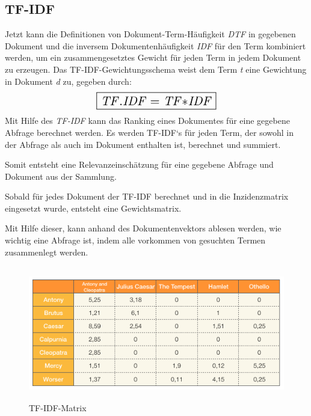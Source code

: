 \subsection[TF{}-IDF]{TF-IDF}
Jetzt kann die Definitionen von Dokument-Term-Häufigkeit \textit{DTF} in
gegebenen Dokument und die inversem Dokumentenhäufigkeit \textit{IDF} für den
Term kombiniert werden, um ein zusammengesetztes Gewicht für jeden Term
in jedem Dokument zu erzeugen.
\newline
Das TF-IDF-Gewichtungsschema weist dem Term \textit{t} eine Gewichtung in
Dokument \textit{d} zu, gegeben durch:
\begin{equation*}
\scalebox{1.5}{\boxed{\mathit{TF}.\mathit{IDF}=\mathit{TF}{\ast}\mathit{IDF}}}
\end{equation*}
Mit Hilfe des \textit{TF-IDF} kann das Ranking eines Dokumentes für eine gegebene
Abfrage berechnet werden. Es werden TF-IDF‘s für jeden Term, der sowohl
in der Abfrage als auch im Dokument enthalten ist, berechnet und
summiert.

Somit entsteht eine Relevanzeinschätzung für eine gegebene Abfrage und
Dokument aus der Sammlung.
\newline
\begin{figure}[h]
\centering
{}
\end{figure}

Sobald für jedes Dokument der TF-IDF berechnet und in die Inzidenzmatrix
eingesetzt wurde, entsteht eine Gewichtsmatrix.

Mit Hilfe dieser, kann anhand des Dokumentenvektors ablesen werden, wie
wichtig eine Abfrage ist, indem alle vorkommen von gesuchten Termen
zusammenlegt werden.

\begin{figure}[h]
	\centering
	\includegraphics[width=13.208cm,height=5.854cm]{bilder/SeminararbeitArkadij-img5.png}
	\caption {TF-IDF-Matrix}
\end{figure}

